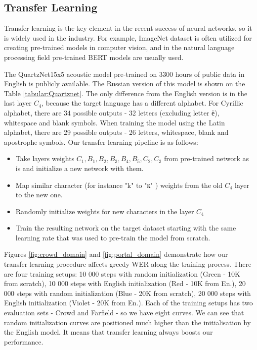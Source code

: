 \documentclass[a4paper]{article}
\begin{document}
\subsection{Transfer Learning}

Transfer learning is the key element in the recent success of neural networks, so it is widely used in the industry. For example, ImageNet dataset is often utilized for creating pre-trained models in computer vision, and in the natural language processing field pre-trained BERT models are usually used. 

The QuartzNet15x5 acoustic model pre-trained on 3300 hours of public data in English is publicly available. The Russian version of this model is shown on the Table \ref{tabular:Quartznet}. The only difference from the English version is in the last layer $C_4$, because the target language has a different alphabet. For Cyrillic alphabet, there are 34 possible outputs - 32 letters (excluding letter ё), whitespace and blank symbols. When training the model using the Latin alphabet, there are 29 possible outputs - 26 letters, whitespace, blank and apostrophe symbols. Our transfer learning pipeline is as follows:
\begin{itemize}
    \item Take layers weights $C_1, B_1, B_2, B_3, B_4, B_5, C_2, C_3$ from pre-trained network as is and initialize a new network with them.
    \item Map similar character (for instance "k"  to "к" ) weights from the old $C_4$ layer to the new one.
    \item Randomly initialize weights for new characters in the layer $C_4$
    \item Train the resulting network on the target dataset starting with the same learning rate that was used to pre-train the model from scratch.
\end{itemize}

Figures \ref{fig:crowd_domain} and \ref{fig:portal_domain} demonstrate how our transfer learning procedure affects greedy WER along the training process. There are four training setups: 10 000 steps with random initialization (Green - 10K from scratch), 10 000 steps with English initialization (Red - 10K from En.), 20 000 steps with random initialization (Blue - 20K from scratch), 20 000 steps with English initialization (Violet - 20K from En.). Each of the training setups has two evaluation sets - Crowd and Farfield - so we have eight curves. We can see that random initialization curves are positioned much higher than the initialisation by the English model. It means that transfer learning always boosts our performance.
\end{document}
